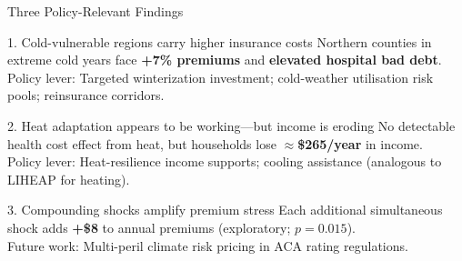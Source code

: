 \documentclass[aspectratio=169,11pt]{beamer}
\newcommand{\emphcolor}[1]{{\color{WarmOrange}\textbf{#1}}}
\newcommand{\tealtext}[1]{{\color{Teal}#1}}
\begin{document}
\begin{frame}{Three Policy-Relevant Findings}
  \begin{block}{1. Cold-vulnerable regions carry higher insurance costs}
    Northern counties in extreme cold years face \emphcolor{+7\% premiums} and \emphcolor{elevated hospital bad debt}.\\
    \tealtext{Policy lever:} Targeted winterization investment; cold-weather utilisation risk pools; reinsurance corridors.
  \end{block}
  \vspace{0.3em}
  \begin{block}{2. Heat adaptation appears to be working---but income is eroding}
    No detectable health cost effect from heat, but households lose \emphcolor{$\approx$\$265/year} in income.\\
    \tealtext{Policy lever:} Heat-resilience income supports; cooling assistance (analogous to LIHEAP for heating).
  \end{block}
  \vspace{0.3em}
  \begin{alertblock}{3. Compounding shocks amplify premium stress}
    Each additional simultaneous shock adds \emphcolor{+\$8} to annual premiums (exploratory; $p=0.015$).\\
    \tealtext{Future work:} Multi-peril climate risk pricing in ACA rating regulations.
  \end{alertblock}
\end{frame}
\end{document}
